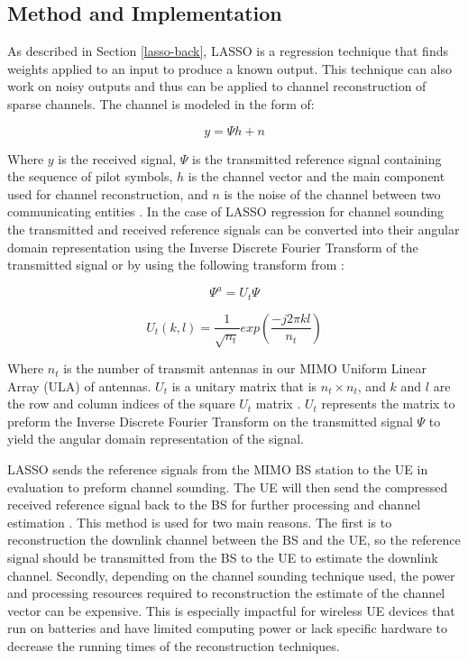 \subsection{Method and Implementation}
As described in Section \ref{lasso-back}, LASSO is a regression technique that finds weights applied to an input to produce a known output. This technique can also work on noisy outputs and thus can be applied to channel reconstruction of sparse channels. The channel is modeled in the form of:

\[ y = \Psi h + n \]

Where $y$ is the received signal, $\Psi$ is the transmitted reference signal containing the sequence of pilot symbols, $h$ is the channel vector and the main component used for channel reconstruction, and $n$ is the noise of the channel between two communicating entities \cite{Tse2004}. In the case of LASSO regression for channel sounding the transmitted and received reference signals can be converted into their angular domain representation using the Inverse Discrete Fourier Transform of the transmitted signal or by using the following transform from \cite{Tse2004}:

\[ \Psi^a = U_t \Psi \]

\[ U_t(k,l) = \dfrac{1}{\sqrt{n_t}} exp(\dfrac{-j2\pi k l}{n_t}) \] 

Where $n_t$ is the number of transmit antennas in our MIMO Uniform Linear Array (ULA) of antennas. $U_t$ is a unitary matrix that is $n_t \times n_t$, and $k$ and $l$ are the row and column indices of the square $U_t$ matrix \cite{Tse2004}. $U_t$ represents the matrix to preform the Inverse Discrete Fourier Transform on the transmitted signal $\Psi$ to yield the angular domain representation of the signal.

LASSO sends the reference signals from the MIMO BS station to the UE in evaluation to preform channel sounding. The UE will then send the compressed received reference signal back to the BS for further processing and channel estimation \cite{Liu2016}. This method is used for two main reasons. The first is to reconstruction the downlink channel between the BS and the UE, so the reference signal should be transmitted from the BS to the UE to estimate the downlink channel. Secondly, depending on the channel sounding technique used, the power and processing resources required to reconstruction the estimate of the channel vector can be expensive. This is especially impactful for wireless UE devices that run on batteries and have limited computing power or lack specific hardware to decrease the running times of the reconstruction techniques.


